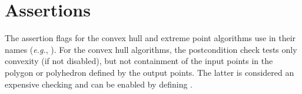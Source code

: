 
\section{Assertions}
The assertion flags for the convex hull and extreme point algorithms
use  in their names (\textit{e.g.}, ).  
For the convex hull algorithms, the postcondition
check tests only convexity (if not disabled), but not containment of the
input points in the polygon or polyhedron defined by the output points. 
The latter is considered an expensive checking and can be enabled by
defining %
. 
